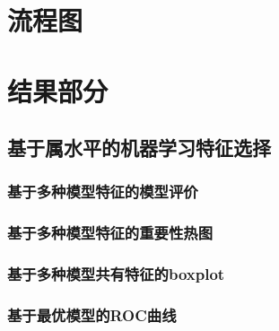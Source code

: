 \documentclass[
]{article}
\author{}
\date{\vspace{-2.5em}}
\begin{document}
\hypertarget{ux6d41ux7a0bux56fe}{%
\section{流程图}\label{ux6d41ux7a0bux56fe}}

\hypertarget{ux7ed3ux679cux90e8ux5206}{%
\section{结果部分}\label{ux7ed3ux679cux90e8ux5206}}

\hypertarget{ux57faux4e8eux5c5eux6c34ux5e73ux7684ux673aux5668ux5b66ux4e60ux7279ux5f81ux9009ux62e9}{%
\subsection{基于属水平的机器学习特征选择}\label{ux57faux4e8eux5c5eux6c34ux5e73ux7684ux673aux5668ux5b66ux4e60ux7279ux5f81ux9009ux62e9}}

\hypertarget{ux57faux4e8eux591aux79cdux6a21ux578bux7279ux5f81ux7684ux6a21ux578bux8bc4ux4ef7}{%
\subsubsection{基于多种模型特征的模型评价}\label{ux57faux4e8eux591aux79cdux6a21ux578bux7279ux5f81ux7684ux6a21ux578bux8bc4ux4ef7}}

\hypertarget{ux57faux4e8eux591aux79cdux6a21ux578bux7279ux5f81ux7684ux91cdux8981ux6027ux70edux56fe}{%
\subsubsection{基于多种模型特征的重要性热图}\label{ux57faux4e8eux591aux79cdux6a21ux578bux7279ux5f81ux7684ux91cdux8981ux6027ux70edux56fe}}

\hypertarget{ux57faux4e8eux591aux79cdux6a21ux578bux5171ux6709ux7279ux5f81ux7684boxplot}{%
\subsubsection{基于多种模型共有特征的boxplot}\label{ux57faux4e8eux591aux79cdux6a21ux578bux5171ux6709ux7279ux5f81ux7684boxplot}}

\hypertarget{ux57faux4e8eux6700ux4f18ux6a21ux578bux7684rocux66f2ux7ebf}{%
\subsubsection{基于最优模型的ROC曲线}\label{ux57faux4e8eux6700ux4f18ux6a21ux578bux7684rocux66f2ux7ebf}}
\end{document}
